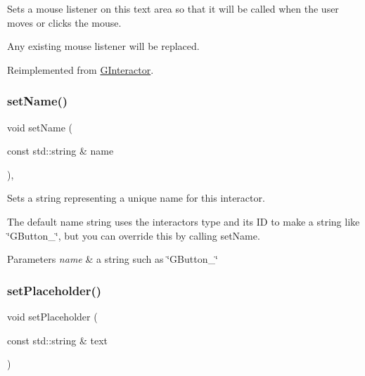 Sets a mouse listener on this text area so that it will be called when the user moves or clicks the mouse. 

Any existing mouse listener will be replaced. 

Reimplemented from \mbox{\hyperlink{classsgl_1_1GInteractor_aea7f647ea62d59f71b5fad6aa65eeaf9}{G\+Interactor}}.

\mbox{\label{classsgl_1_1GInteractor_a9d3a2685df23b5e7cbf59c19c4a1f9b5}} 
\subsubsection{\texorpdfstring{set\+Name()}{setName()}}
{\footnotesize\ttfamily void set\+Name (\begin{DoxyParamCaption}\item[{const std\+::string \&}]{name }\end{DoxyParamCaption})\hspace{0.3cm}{\ttfamily [virtual]}, {\ttfamily [inherited]}}



Sets a string representing a unique name for this interactor. 

The default name string uses the interactor\textquotesingle{}s type and its ID to make a string like \char`\"{}\+G\+Button\+\_\char`\"{}, but you can override this by calling set\+Name. 
\begin{DoxyParams}{Parameters}
{\em name} & a string such as \char`\"{}\+G\+Button\+\_\char`\"{} \\
\hline
\end{DoxyParams}
\mbox{\label{classsgl_1_1GTextArea_aa21a9bebb4652ab6780d0c11eff47aee}} 
\subsubsection{\texorpdfstring{set\+Placeholder()}{setPlaceholder()}}
{\footnotesize\ttfamily void set\+Placeholder (\begin{DoxyParamCaption}\item[{const std\+::string \&}]{text }\end{DoxyParamCaption})\hspace{0.3cm}{\ttfamily [virtual]}}



